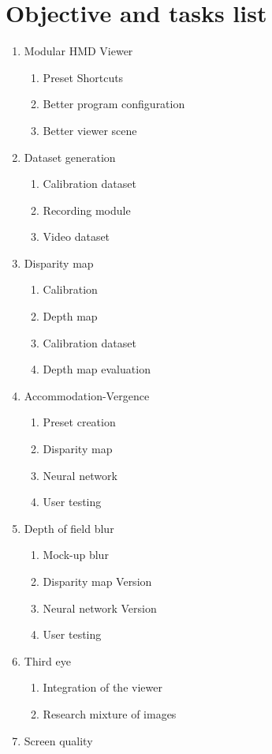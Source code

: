 \documentclass[10pt,a4paper,twocolumn,twoside]{article}
\begin{document}
	\section{Objective and tasks list}
	\begin{enumerate}
		\item \label{obj:viewer} Modular HMD Viewer 
		\begin{enumerate}
			\item Preset Shortcuts
			\item Better program configuration
			\item Better viewer scene
		\end{enumerate}
	
		\item Dataset generation
		\begin{enumerate}
			\item Calibration dataset
			\item \label{obj:dataset:record} Recording module
			\item \label{obj:dataset:video} Video dataset
		\end{enumerate}
	
		\item \label{obj:dispmap} Disparity map
		\begin{enumerate}
			\item Calibration
			\item Depth map
			\item Calibration dataset
			\item \label{obj:dispmap:eval} Depth map evaluation
		\end{enumerate}
	
		\item \label{obj:acc} Accommodation-Vergence
		\begin{enumerate}
			\item \label{obj:acc:preset} Preset creation
			\item \label{obj:acc:dispmap} Disparity map
			\item \label{obj:acc:nn} Neural network
			\item User testing
		\end{enumerate}
	
		\item Depth of field blur
		\begin{enumerate}
			\item Mock-up blur
			\item Disparity map Version
			\item \label{obj:dof:nn} Neural network Version
			\item User testing
		\end{enumerate}
	
		\item \label{obj:third} Third eye
		\begin{enumerate}
			\item Integration of the viewer
			\item \label{obj:third:mix} Research mixture of images
		\end{enumerate}
		
		\item \label{obj:screen} Screen quality
	\end{enumerate}
\end{document}
